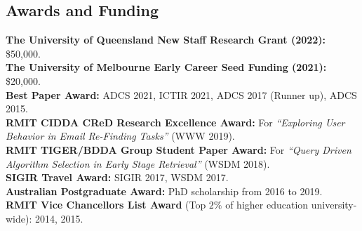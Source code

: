 \documentclass[line]{res}
\begin{document}
\begin{resume}
\section{Awards and Funding}
  {\bf The University of Queensland New Staff Research Grant (2022):} \$50,000.\\
  {\bf The University of Melbourne Early Career Seed Funding (2021):} \$20,000.\\
  {\bf Best Paper Award:} ADCS 2021, ICTIR 2021, ADCS 2017 (Runner up), ADCS 2015.\\
  {\bf RMIT CIDDA CReD Research Excellence Award:} For {\emph{``Exploring User Behavior in Email Re-Finding Tasks''}} (WWW 2019).\\
  {\bf RMIT TIGER/BDDA Group Student Paper Award:} For {\emph{``Query Driven Algorithm Selection in Early Stage Retrieval''}} (WSDM 2018).\\
  {\bf SIGIR Travel Award:}  SIGIR 2017, WSDM 2017.\\
  {\bf Australian Postgraduate Award:} PhD scholarship from 2016 to 2019.\\
  {\bf RMIT Vice Chancellors List Award} (Top $2\%$ of higher education university-wide): 2014, 2015.


\end{resume}
\end{document}
